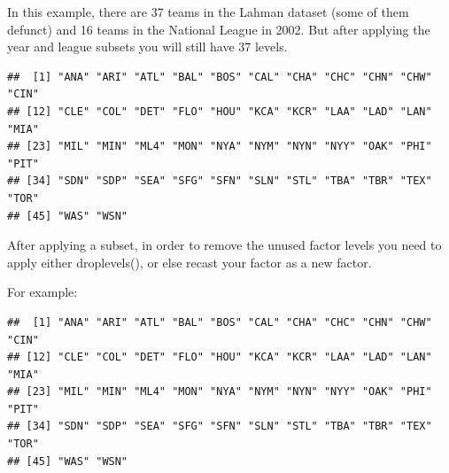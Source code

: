 \documentclass[]{book}
\newenvironment{Shaded}{\begin{snugshade}}{\end{snugshade}}
\newcommand{\CommentTok}[1]{\textcolor[rgb]{0.56,0.35,0.01}{\textit{#1}}}
\newcommand{\FloatTok}[1]{\textcolor[rgb]{0.00,0.00,0.81}{#1}}
\newcommand{\KeywordTok}[1]{\textcolor[rgb]{0.13,0.29,0.53}{\textbf{#1}}}
\newcommand{\NormalTok}[1]{#1}
\newcommand{\OperatorTok}[1]{\textcolor[rgb]{0.81,0.36,0.00}{\textbf{#1}}}
\newcommand{\StringTok}[1]{\textcolor[rgb]{0.31,0.60,0.02}{#1}}
\theoremstyle{definition}
\theoremstyle{definition}
\theoremstyle{definition}
\theoremstyle{remark}
\begin{document}
In this example, there are 37 teams in the Lahman dataset (some of them
defunct) and 16 teams in the National League in 2002. But after applying
the year and league subsets you will still have 37 levels.

\begin{Shaded}
\end{Shaded}

\begin{verbatim}
##  [1] "ANA" "ARI" "ATL" "BAL" "BOS" "CAL" "CHA" "CHC" "CHN" "CHW" "CIN"
## [12] "CLE" "COL" "DET" "FLO" "HOU" "KCA" "KCR" "LAA" "LAD" "LAN" "MIA"
## [23] "MIL" "MIN" "ML4" "MON" "NYA" "NYM" "NYN" "NYY" "OAK" "PHI" "PIT"
## [34] "SDN" "SDP" "SEA" "SFG" "SFN" "SLN" "STL" "TBA" "TBR" "TEX" "TOR"
## [45] "WAS" "WSN"
\end{verbatim}

After applying a subset, in order to remove the unused factor levels you
need to apply either droplevels(), or else recast your factor as a new
factor.

For example:

\begin{Shaded}
\end{Shaded}

\begin{verbatim}
##  [1] "ANA" "ARI" "ATL" "BAL" "BOS" "CAL" "CHA" "CHC" "CHN" "CHW" "CIN"
## [12] "CLE" "COL" "DET" "FLO" "HOU" "KCA" "KCR" "LAA" "LAD" "LAN" "MIA"
## [23] "MIL" "MIN" "ML4" "MON" "NYA" "NYM" "NYN" "NYY" "OAK" "PHI" "PIT"
## [34] "SDN" "SDP" "SEA" "SFG" "SFN" "SLN" "STL" "TBA" "TBR" "TEX" "TOR"
## [45] "WAS" "WSN"
\end{verbatim}
\end{document}
